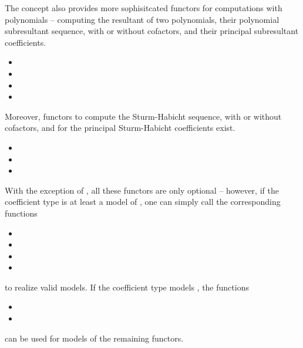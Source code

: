 The  concept also provides more sophisitcated functors
for computations with polynomials --
computing the resultant of two polynomials, 
their polynomial subresultant sequence, with or without cofactors,
and their principal subresultant coefficients.
%
\begin{itemize}
\item {}\ccGlue
\item {}\ccGlue
\item {}\ccGlue
\item {}
\end{itemize}
%
Moreover, functors to compute the Sturm-Habicht sequence, with or without
cofactors, and for the principal Sturm-Habicht coefficients exist.
%
\begin{itemize}
\item {}\ccGlue
\item {}\ccGlue
\item {}
\end{itemize}
%
With the exception of ,
all these functors are only optional -- however, if the coefficient type
is at least a model of ,
one can simply call the corresponding functions
\begin{itemize}
\item {}\ccGlue
\item {}\ccGlue
\item {}\ccGlue
\item {}
\end{itemize}
to realize valid models. If the coefficient type models ,
the functions
\begin{itemize}
\item {}\ccGlue
\item {}
\end{itemize}
can be used for models of the remaining functors.

